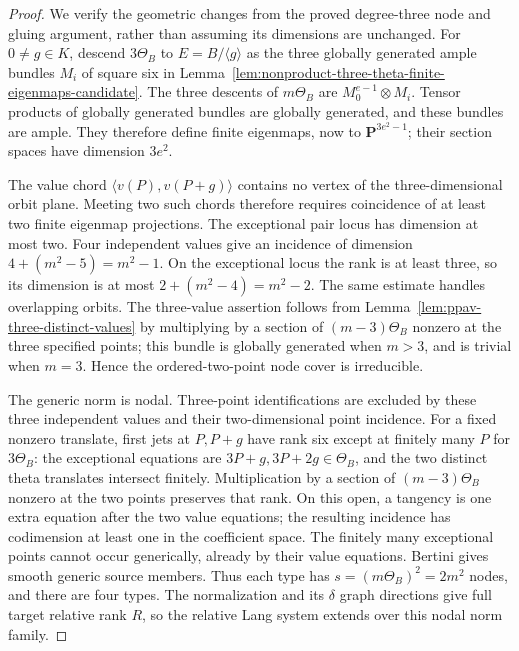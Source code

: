 \begin{proof}
We verify the geometric changes from the proved degree-three
node and gluing argument, rather than assuming its dimensions
are unchanged.  For $0\ne g\in K$, descend $3\Theta_B$ to
$E=B/\langle g\rangle$ as the three globally generated ample
bundles $M_i$ of square six in
Lemma~\ref{lem:nonproduct-three-theta-finite-eigenmaps-candidate}.
The three descents of $m\Theta_B$ are
$M_0^{e-1}\otimes M_i$.  Tensor products of globally generated
bundles are globally generated, and these bundles are ample.
They therefore define finite eigenmaps, now to
$\mathbf P^{3e^2-1}$; their section spaces have dimension $3e^2$.

The value chord $\langle v(P),v(P+g)\rangle$ contains no vertex
of the three-dimensional orbit plane.  Meeting two such chords
therefore requires coincidence of at least two finite eigenmap
projections.  The exceptional pair locus has dimension at most
two.  Four independent values give an incidence of dimension
$4+(m^2-5)=m^2-1$.  On the exceptional locus the rank is at
least three, so its dimension is at most
$2+(m^2-4)=m^2-2$.  The same estimate handles overlapping
orbits.  The three-value assertion follows from
Lemma~\ref{lem:ppav-three-distinct-values} by multiplying by a
section of $(m-3)\Theta_B$ nonzero at the three specified points;
this bundle is globally generated when $m>3$, and is trivial
when $m=3$.  Hence the ordered-two-point node cover is irreducible.

The generic norm is nodal.  Three-point identifications are
excluded by these three independent values and their two-dimensional
point incidence.  For a fixed nonzero translate, first jets at
$P,P+g$ have rank six except at finitely many $P$ for $3\Theta_B$:
the exceptional equations are $3P+g,3P+2g\in\Theta_B$, and the
two distinct theta translates intersect finitely.  Multiplication
by a section of $(m-3)\Theta_B$ nonzero at the two points preserves
that rank.  On this open, a tangency is one extra equation after
the two value equations; the resulting incidence has codimension
at least one in the coefficient space.  The finitely many exceptional
points cannot occur generically, already by their value equations.
Bertini gives smooth generic source members.  Thus each type has
$s=(m\Theta_B)^2=2m^2$ nodes, and there are four types.
The normalization and its $\delta$ graph directions give full
target relative rank $R$, so the relative Lang system extends
over this nodal norm family.


\end{proof}
